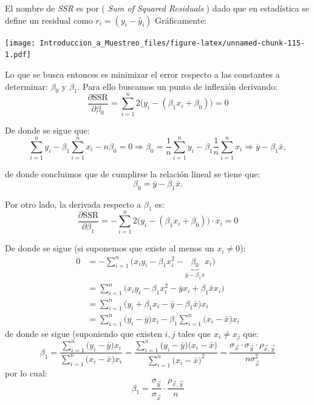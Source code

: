 \documentclass[
]{book}
\begin{document}
El nombre de \emph{SSR} es por ( \emph{Sum of Squared Residuals} ) dado que en estadística se define un residual como \(r_i = (y_i - \hat{y}_i)\)
Gráficamente:

\texttt{[image: Introduccion\_a\_Muestreo\_files/figure-latex/unnamed-chunk-115-1.pdf]}

Lo que se busca entonces es minimizar el error respecto a las constantes a determinar: \(\beta_0\) y \(\beta_1\). Para ello buscamos un punto de inflexión derivando:
\[
\dfrac{\partial\textrm{SSR}}{\partial \beta_0} = \sum\limits_{i=1}^{n} 2\big(y_i - (\beta_1 x_i + \beta_0 ) \big) = 0
\]

De donde se sigue que:
\[
\sum\limits_{i=1}^n y_i - \beta_1 \sum\limits_{i=1}^{n} x_i - n \beta_0 = 0 \Rightarrow \beta_0 = \dfrac{1}{n} \sum\limits_{i=1}^n y_i - \beta_1 \dfrac{1}{n} \sum\limits_{i=1}^n x_i \Rightarrow \bar{y} - \beta_1 \bar{x},
\]

de donde concluimos que de cumplirse la relación lineal se tiene que:
\[
\beta_0 = \bar{y} - \beta_1 \bar{x}.
\]

Por otro lado, la derivada respecto a \(\beta_1\) es:
\[
\dfrac{\partial\textrm{SSR}}{\partial \beta_1} = - \sum\limits_{i=1}^{n} 2\big(y_i - (\beta_1 x_i + \beta_0 ) \big) \cdot x_i = 0
\]

De donde se sigue (si suponemos que existe al menos un \(x_i \neq 0\)):
\begin{equation}\nonumber
\begin{aligned}
0 & = - \sum\limits_{i=1}^n \Big( x_i y_i - \beta_1  x_i^2 - \underbrace{\beta_0}_{\bar{y} - \beta_1 \bar{x}} x_i \Big)  \\
& = \sum\limits_{i=1}^n \Big( x_i y_i - \beta_1  x_i^2 - \bar{y}x_i + \beta_1 \bar{x} x_i \Big) \\
& = \sum\limits_{i=1}^n \Big( y_i + \beta_1  x_i - \bar{y} - \beta_1 \bar{x} \Big) x_i \\
& = \sum\limits_{i=1}^n \Big( y_i  - \bar{y} \Big) x_i - \beta_1  \sum\limits_{i=1}^n\Big(   x_i -   \bar{x} \Big) x_i
\end{aligned}
\end{equation}
de donde se sigue (suponiendo que existen \(i,j\) tales que \(x_i \neq x_j\) que:
\[
\beta_1 = \dfrac{\sum_{i=1}^n \Big( y_i  - \bar{y} \Big)x_i}{\sum_{i=1}^n\Big(   x_i -   \bar{x} \Big)x_i} = \dfrac{\sum_{i=1}^n \Big( y_i  - \bar{y} \Big)\Big(   x_i -   \bar{x} \Big)}{\sum_{i=1}^n\Big(   x_i -   \bar{x} \Big)^2} = \dfrac{\sigma_{\vec{x}} \cdot \sigma_{\vec{y}} \cdot \rho_{\vec{x},\vec{y}}}{n \sigma_{\vec{x}}^2}
\]
por lo cual:
\[
\beta_1 = \dfrac{\sigma_{\vec{y}}}{\sigma_{\vec{x}}} \cdot \dfrac{\rho_{\vec{x},\vec{y}}}{n}
\]
\end{document}
